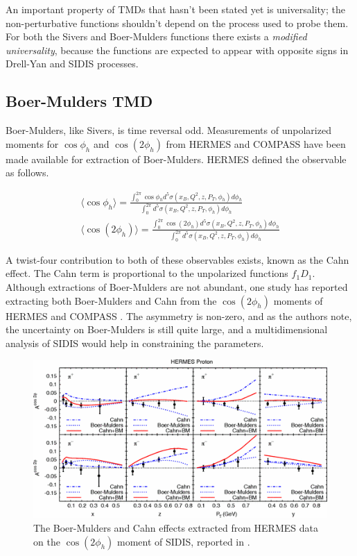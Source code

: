 An important property of TMDs that hasn't been stated yet is universality; the non-perturbative functions shouldn't depend on the process used to probe them.  For both the Sivers and Boer-Mulders functions there exists a \textit{modified universality}, because the functions are expected to appear with opposite signs in Drell-Yan and SIDIS processes.

\subsection{Boer-Mulders TMD}
Boer-Mulders, like Sivers, is time reversal odd.  Measurements of unpolarized moments for $\cos\phi_h$ and $\cos(2\phi_h)$ from HERMES and COMPASS have been made available for extraction of Boer-Mulders.  HERMES defined the observable as follows. 

\begin{gather}
	\langle \cos\phi_h \rangle = \frac{\int_{0}^{2\pi} \cos\phi_h d^5\sigma(x_B, Q^2, z, P_T, \phi_h) d\phi_h}{\int_{0}^{2\pi} d^5\sigma(x_B, Q^2, z, P_T, \phi_h) d\phi_h} \\
	\langle \cos(2\phi_h) \rangle = \frac{\int_{0}^{2\pi} \cos(2\phi_h) d^5\sigma(x_B, Q^2, z, P_T, \phi_h) d\phi_h}{\int_{0}^{2\pi} d^5\sigma(x_B, Q^2, z, P_T, \phi_h) d\phi_h}
\end{gather}

A twist-four contribution to both of these observables exists, known as the Cahn effect.  The Cahn term is proportional to the unpolarized functions $f_1 D_1$.  Although extractions of Boer-Mulders are not abundant, one study has reported extracting both Boer-Mulders and Cahn from the $\cos(2\phi_h)$ moments of HERMES and COMPASS \cite{tmds-barone:2009}.  The asymmetry is non-zero, and as the authors note, the uncertainty on Boer-Mulders is still quite large, and a multidimensional analysis of SIDIS would help in constraining the parameters.

\begin{figure}
	\centering
	\includegraphics[width = \textwidth]{image/plots/introduction/boermulders.png}
	\caption{The Boer-Mulders and Cahn effects extracted from HERMES data on the $\cos(2\phi_h)$ moment of SIDIS, reported in \cite{tmds-barone:2009}. }
	\label{fig:boermulders}
\end{figure}

